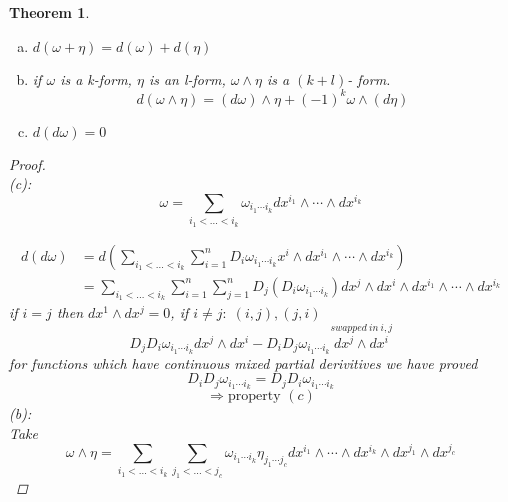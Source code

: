 \documentclass[12pt]{article}
\newtheorem{theorem}{Theorem}[section]
\begin{document}
\begin{theorem}\quad \\
\begin{enumerate}[(a)]
\item $d(\omega + \eta) = d(\omega) + d(\eta)$
\item if $\omega$ is a k-form,  $\eta$ is an l-form,  $\omega\wedge\eta$ is a $(k+l)$- form.
\[d(\omega\wedge\eta) = (d\omega)\wedge\eta + (-1)^k\omega\wedge(d\eta)\]
\item $d(d\omega) = 0$
\end{enumerate}

\begin{proof}\quad\\
(c):
\[\omega = \sum\limits_{i_1<\dots <i_k}\omega_{i_1\cdots i_k}dx^{i_1}\wedge\cdots\wedge dx^{i_k}\]

\begin{align*}
d(d\omega) &= d\left(\sum\limits_{i_1<\dots <i_k}\sum\limits_{i=1}^n D_i\omega_{i_1\cdots i_k}x^i\wedge dx^{i_1}\wedge\cdots\wedge dx^{i_k}\right)\\
&=\sum\limits_{i_1<\dots <i_k}\sum\limits_{i=1}^n\sum\limits_{j=1}^n D_j\left( D_i\omega_{i_1\cdots i_k}\right)dx^j\wedge dx^i\wedge dx^{i_1}\wedge\cdots\wedge dx^{i_k}
\end{align*}
if $i=j$ then $dx^1\wedge dx^j =0$, if $i \neq j: \; (i,j) , (j,i)$
\[  D_jD_i\omega_{i_1\cdots i_k}dx^j\wedge dx^i -D_iD_j\omega_{i_1\cdots i_k}\overset{swapped\: in\: i,j}{ dx^j\wedge dx^i}\]
for functions which have continuous mixed partial derivitives we have proved 
\[D_iD_j\omega_{i_1\cdots i_k}= D_jD_i\omega_{i_1\cdots i_k}\]
\[\Rightarrow \text{property }(c)\]
(b):\quad \\
Take
\[\omega\wedge\eta = \sum\limits_{i_1<\dots <i_k} \sum\limits_{j_1<\dots <j_c}\omega_{i_1\cdots i_k}\eta_{j_1\cdots j_c}dx^{i_1}\wedge\cdots\wedge dx^{i_k}\wedge dx^{j_1}\wedge dx^{j_c}\]




\end{proof}
\end{theorem}
\end{document}
